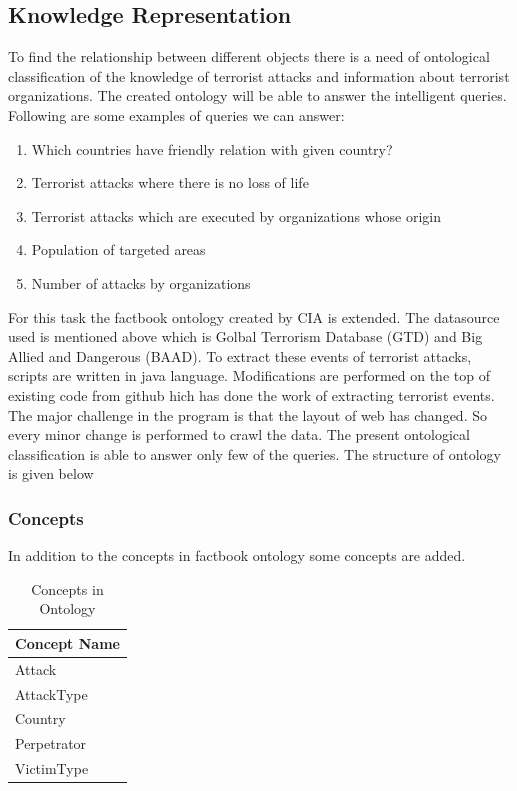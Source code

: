 \documentclass[journal,onecolumn,11pt]{IEEEtran}
\begin{document}
\subsection{Knowledge Representation}
To find the relationship between different objects there is a need of ontological classification of the knowledge of terrorist attacks and information about terrorist organizations. The created ontology will be able to answer the intelligent queries. Following are some examples of queries we can answer:
\begin{enumerate}
\item Which countries have friendly relation with given country?
\item Terrorist attacks where there is no loss of life
\item Terrorist attacks which are executed by organizations whose origin 
\item Population of targeted areas
\item Number of attacks by organizations
\end{enumerate}
For this task the factbook ontology created by CIA \cite{factbook} is extended. The datasource used is mentioned above which is Golbal Terrorism Database (GTD) and Big Allied and Dangerous (BAAD). To extract these events of terrorist attacks, scripts are written in java language. Modifications are performed on the top of existing code from github \cite{github} hich has done the work of extracting terrorist events. The major challenge in the program is that the layout of web has changed. So every minor change is performed to crawl the data. 
The present ontological classification is able to answer only few of the queries. The structure of ontology is given below
\subsubsection{Concepts}
In addition to the concepts in factbook ontology some concepts are added. 
\begin{table}[h!]
\centering
\fontsize{11}{9}\selectfont
\bgroup
\def\arraystretch{1.5}

\begin{tabular}{|l|}
\hline
\textbf{Concept Name} \\ \hline
Attack \\ \hline
AttackType \\ \hline
Country \\ \hline
Perpetrator \\ \hline
VictimType \\ \hline
\end{tabular}
\caption{Concepts in Ontology}
\egroup
\end{table}
\end{document}
